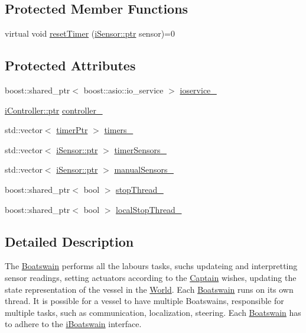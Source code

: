 \subsection*{Protected Member Functions}
\begin{DoxyCompactItemize}
\item 
virtual void \hyperlink{classo_cpt_1_1i_boatswain_a863c877ec067c55b5e06a04d0d9648ce}{reset\+Timer} (\hyperlink{classo_cpt_1_1i_sensor_a03533d2c5dc66e332d70dbb3b5e3006a}{i\+Sensor\+::ptr} sensor)=0
\end{DoxyCompactItemize}
\subsection*{Protected Attributes}
\begin{DoxyCompactItemize}
\item 
boost\+::shared\+\_\+ptr$<$ boost\+::asio\+::io\+\_\+service $>$ \hyperlink{classo_cpt_1_1i_boatswain_a95b337b39962f9c63fd82b500351a960}{ioservice\+\_\+}
\item 
\hyperlink{classo_cpt_1_1i_controller_a6d89a95cd6ad68bb74adfaca2f36370f}{i\+Controller\+::ptr} \hyperlink{classo_cpt_1_1i_boatswain_aafdc26c1366e4eee9cb156c5b6d705cf}{controller\+\_\+}
\item 
std\+::vector$<$ \hyperlink{classo_cpt_1_1i_boatswain_ac42d91dd3964880be9475ccaab4231cd}{timer\+Ptr} $>$ \hyperlink{classo_cpt_1_1i_boatswain_a22f6f6b95b832600c9dc1827589dca3c}{timers\+\_\+}
\item 
std\+::vector$<$ \hyperlink{classo_cpt_1_1i_sensor_a03533d2c5dc66e332d70dbb3b5e3006a}{i\+Sensor\+::ptr} $>$ \hyperlink{classo_cpt_1_1i_boatswain_ac25402266e3daa376e407a9f5ba73130}{timer\+Sensors\+\_\+}
\item 
std\+::vector$<$ \hyperlink{classo_cpt_1_1i_sensor_a03533d2c5dc66e332d70dbb3b5e3006a}{i\+Sensor\+::ptr} $>$ \hyperlink{classo_cpt_1_1i_boatswain_a1b58c7613d0dae24536f2db2e0510799}{manual\+Sensors\+\_\+}
\item 
boost\+::shared\+\_\+ptr$<$ bool $>$ \hyperlink{classo_cpt_1_1i_boatswain_a2fd1fb91df1788bb070ff4e7b7cf2c15}{stop\+Thread\+\_\+}
\item 
boost\+::shared\+\_\+ptr$<$ bool $>$ \hyperlink{classo_cpt_1_1i_boatswain_a38228671875f0c0ed945d2f44422d649}{local\+Stop\+Thread\+\_\+}
\end{DoxyCompactItemize}


\subsection{Detailed Description}
The \hyperlink{classo_cpt_1_1_boatswain}{Boatswain} performs all the labours tasks, suchs updateing and interpretting sensor readings, setting actuators according to the \hyperlink{classo_cpt_1_1_captain}{Captain} wishes, updating the state representation of the vessel in the \hyperlink{classo_cpt_1_1_world}{World}. Each \hyperlink{classo_cpt_1_1_boatswain}{Boatswain} runs on its own thread. It is possible for a vessel to have multiple Boatswains, responsible for multiple tasks, such as communication, localization, steering. Each \hyperlink{classo_cpt_1_1_boatswain}{Boatswain} has to adhere to the \hyperlink{classo_cpt_1_1i_boatswain}{i\+Boatswain} interface. 

